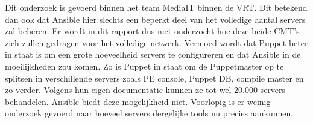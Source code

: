 Dit onderzoek is gevoerd binnen het team MediaIT binnen de VRT. Dit betekend dan ook dat Ansible hier slechts een beperkt deel van het volledige aantal servers zal beheren. Er wordt in dit rapport dus niet onderzocht hoe deze beide \gls{CMT}'s zich zullen gedragen voor het volledige netwerk. Vermoed wordt dat Puppet beter in staat is om een grote hoeveelheid servers te configureren en dat Ansible in de moeilijkheden zou komen. Zo is Puppet in staat om de Puppetmaster op te splitsen in verschillende servers zoals PE console, Puppet DB, compile master en zo verder. Volgens hun eigen documentatie kunnen ze tot wel 20.000 servers behandelen. Ansible biedt deze mogelijkheid niet. Voorlopig is er weinig onderzoek gevoerd naar hoeveel servers dergelijke tools nu precies aankunnen. 